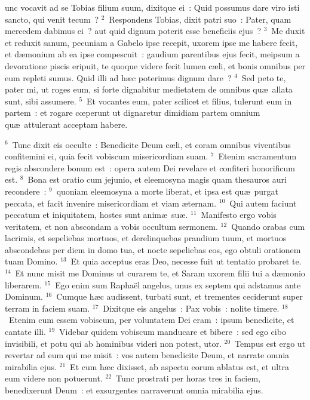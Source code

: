 \bchapter
{}unc vocavit ad se Tobias filium suum, dixitque ei~: Quid possumus dare viro isti sancto, qui venit tecum~?
${}^{2}$~Respondens Tobias, dixit patri suo~: Pater, quam mercedem dabimus ei~? aut quid dignum poterit esse beneficiis ejus~?
${}^{3}$~Me duxit et reduxit sanum, pecuniam a Gabelo ipse recepit, uxorem ipse me habere fecit, et d\ae monium ab ea ipse compescuit~: gaudium parentibus ejus fecit, meipsum a devoratione piscis eripuit, te quoque videre fecit lumen c\ae li, et bonis omnibus per eum repleti sumus. Quid illi ad h\ae c poterimus dignum dare~?
${}^{4}$~Sed peto te, pater mi, ut roges eum, si forte dignabitur medietatem de omnibus qu\ae\ allata sunt, sibi assumere.
${}^{5}$~Et vocantes eum, pater scilicet et filius, tulerunt eum in partem~: et rogare cœperunt ut dignaretur dimidiam partem omnium qu\ae\ attulerant acceptam habere.


${}^{6}$~Tunc dixit eis occulte~: Benedicite Deum c\ae li, et coram omnibus viventibus confitemini ei, quia fecit vobiscum misericordiam suam.
${}^{7}$~Etenim sacramentum regis abscondere bonum est~: opera autem Dei revelare et confiteri honorificum est.
${}^{8}$~Bona est oratio cum jejunio, et eleemosyna magis quam thesauros auri recondere~:
${}^{9}$~quoniam eleemosyna a morte liberat, et ipsa est qu\ae\ purgat peccata, et facit invenire misericordiam et viam \ae ternam.
${}^{10}$~Qui autem faciunt peccatum et iniquitatem, hostes sunt anim\ae\ su\ae .
${}^{11}$~Manifesto ergo vobis veritatem, et non abscondam a vobis occultum sermonem.
${}^{12}$~Quando orabas cum lacrimis, et sepeliebas mortuos, et derelinquebas prandium tuum, et mortuos abscondebas per diem in domo tua, et nocte sepeliebas eos, ego obtuli orationem tuam Domino.
${}^{13}$~Et quia acceptus eras Deo, necesse fuit ut tentatio probaret te.
${}^{14}$~Et nunc misit me Dominus ut curarem te, et Saram uxorem filii tui a d\ae monio liberarem.
${}^{15}$~Ego enim sum Rapha\"el angelus, unus ex septem qui adstamus ante Dominum.
${}^{16}$~Cumque h\ae c audissent, turbati sunt, et trementes ceciderunt super terram in faciem suam.
${}^{17}$~Dixitque eis angelus~: Pax vobis~: nolite timere.
${}^{18}$~Etenim cum essem vobiscum, per voluntatem Dei eram~: ipsum benedicite, et cantate illi.
${}^{19}$~Videbar quidem vobiscum manducare et bibere~: sed ego cibo invisibili, et potu qui ab hominibus videri non potest, utor.
${}^{20}$~Tempus est ergo ut revertar ad eum qui me misit~: vos autem benedicite Deum, et narrate omnia mirabilia ejus.
${}^{21}$~Et cum h\ae c dixisset, ab aspectu eorum ablatus est, et ultra eum videre non potuerunt.
${}^{22}$~Tunc prostrati per horas tres in faciem, benedixerunt Deum~: et exsurgentes narraverunt omnia mirabilia ejus.


